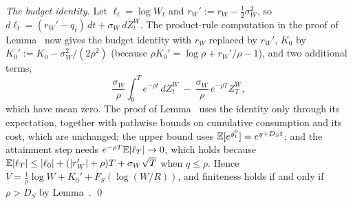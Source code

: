 \emph{The budget identity.} Let $\ell_t=\log W_t$ and $r_W':=r_W-\tfrac12\sigma_W^2$, so $d\ell_t=(r_W'-q_t)\,dt+\sigma_W\,dZ^W_t$. The product-rule computation in the proof of Lemma~ now gives the budget identity with $r_W$ replaced by $r_W'$, $K_0$ by $K_0':=K_0-\sigma_W^2/(2\rho^2)$ (because $\rho K_0'=\log\rho+r_W'/\rho-1$), and two additional terms,
\[
\frac{\sigma_W}{\rho}\int_0^Te^{-\rho t}\,dZ^W_t\ -\ \frac{\sigma_W}{\rho}\,e^{-\rho T}Z^W_T ,
\]
which have mean zero. The proof of Lemma~ uses the identity only through its expectation, together with pathwise bounds on cumulative consumption and its cost, which are unchanged; the upper bound uses $\mathbb{E}[e^{y^0_t}]=e^{y+D_St}$; and the attainment step needs $e^{-\rho T}\mathbb{E}|\ell_T|\to0$, which holds because $\mathbb{E}|\ell_T|\le|\ell_0|+(|r_W'|+\rho)T+\sigma_W\sqrt T$ when $q\le\rho$. Hence $V=\frac1\rho\log W+K_0'+F_S(\log(W/R))$, and finiteness holds if and only if $\rho>D_S$ by Lemma~. \qed
